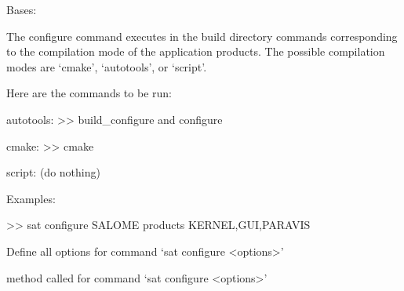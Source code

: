 \documentclass[a4paper,10pt,english]{sphinxmanual}
\begin{document}
\begin{fulllineitems}
\label{\detokenize{apidoc_commands/commands:commands.configure.Command}}
Bases: 

The configure command executes in the build directory commands
corresponding to the compilation mode of the application products.
The possible compilation modes are ‘cmake’, ‘autotools’, or ‘script’.

\begin{DUlineblock}{0em}
\item[] Here are the commands to be run:
\item[]
\begin{DUlineblock}{\DUlineblockindent}
\item[] autotools: \textgreater{}\textgreater{} build\_configure and configure
\item[] cmake:     \textgreater{}\textgreater{} cmake
\item[] script:    (do nothing)
\item[] 
\end{DUlineblock}
\item[] Examples:
\item[] \textgreater{}\textgreater{} sat configure SALOME \textendash{}products KERNEL,GUI,PARAVIS
\end{DUlineblock}

\begin{fulllineitems}
\label{\detokenize{apidoc_commands/commands:commands.configure.Command.getParser}}
Define all options for command ‘sat configure \textless{}options\textgreater{}’

\end{fulllineitems}


\begin{fulllineitems}
\label{\detokenize{apidoc_commands/commands:commands.configure.Command.name}}
\end{fulllineitems}


\begin{fulllineitems}
\label{\detokenize{apidoc_commands/commands:commands.configure.Command.run}}
method called for command ‘sat configure \textless{}options\textgreater{}’

\end{fulllineitems}


\end{fulllineitems}
\end{document}
